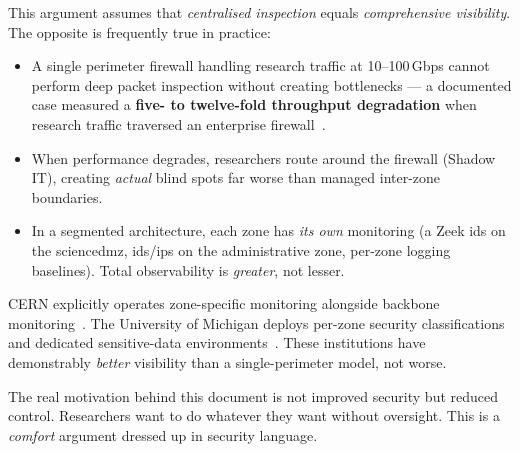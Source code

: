 \begin{answerbox}[Answer to Q1.2]
This argument assumes that \emph{centralised inspection} equals \emph{comprehensive visibility}. The opposite is frequently true in practice:

\begin{itemize}[nosep]
    \item A single perimeter firewall handling research traffic at 10--100\,Gbps cannot perform deep packet inspection without creating bottlenecks --- a documented case measured a \textbf{five- to twelve-fold throughput degradation} when research traffic traversed an enterprise firewall~\cite{esnet-pennstate}.
    \item When performance degrades, researchers route around the firewall (Shadow IT), creating \emph{actual} blind spots far worse than managed inter-zone boundaries.
    \item In a segmented architecture, each zone has \emph{its own} monitoring (a Zeek \gls{ids} on the \gls{sciencedmz}, \gls{ids}/\gls{ips} on the administrative zone, per-zone logging baselines). Total observability is \emph{greater}, not lesser.
\end{itemize}

\noindent CERN explicitly operates zone-specific monitoring alongside backbone monitoring~\cite{cern-security-freedom}. The University of Michigan deploys per-zone security classifications and dedicated sensitive-data environments~\cite{umich-safecomputing}. These institutions have demonstrably \emph{better} visibility than a single-perimeter model, not worse.
\end{answerbox}

\bigskip

\begin{clarificationbox}
The real motivation behind this document is not improved security but reduced control. Researchers want to do whatever they want without oversight. This is a \emph{comfort} argument dressed up in security language.
\end{clarificationbox}

